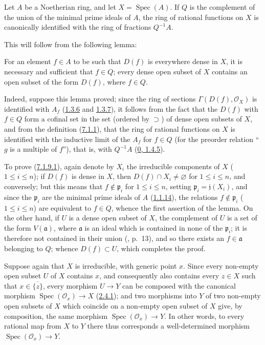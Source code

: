 \begin{corollary}[7.1.9]
\label{I.7.1.9}
Let $A$ be a Noetherian ring, and let $X=\operatorname{Spec}(A)$. If $Q$ is
the complement of the union of the minimal prime ideals of $A$, the ring of
rational functions on $X$ is canonically identified with the ring of
fractions $Q^{-1}A$.
\end{corollary}

This will follow from the following lemma:

\begin{lemma}[7.1.9.1]
\label{I.7.1.9.1}
For an element $f\in A$ to be such that $D(f)$ is everywhere dense in $X$, it
is necessary and sufficient that $f\in Q$; every dense open subset of $X$
contains an open subset of the form $D(f)$, where $f\in Q$.
\end{lemma}

Indeed, suppose this lemma proved; since the ring of sections
$\Gamma(D(f),\mathscr{O}_X)$ is identified with $A_f$
(\hyperref[I.1.3.6]{1.3.6} and \hyperref[I.1.3.7]{1.3.7}), it follows
from the fact that the $D(f)$ with $f\in Q$ form a cofinal set in the set
(ordered by $\supset$) of dense open subsets of $X$, and from the definition
(\hyperref[I.7.1.1]{7.1.1}), that the ring of rational functions on $X$ is
identified with the inductive limit of the $A_f$ for $f\in Q$ (for the
preorder relation ``$g$ is a multiple of $f$''), that is, with $Q^{-1}A$
(\hyperref[0.1.4.5]{0, 1.4.5}).

To prove (\hyperref[I.7.1.9.1]{7.1.9.1}), again denote by $X_i$ the
irreducible components of $X$ ($1\leq i\leq n$); if $D(f)$ is dense in $X$,
then $D(f)\cap X_i\neq\varnothing$ for $1\leq i\leq n$, and conversely; but
this means that $f\notin\mathfrak{p}_i$ for $1\leq i\leq n$, setting
$\mathfrak{p}_i=\mathfrak{j}(X_i)$, and since the $\mathfrak{p}_i$ are the
minimal prime ideals of $A$ (\hyperref[I.1.1.14]{1.1.14}), the relations
$f\notin\mathfrak{p}_i$ ($1\leq i\leq n$) are equivalent to $f\in Q$, whence
the first assertion of the lemma. On the other hand, if $U$ is a dense open
subset of $X$, the complement of $U$ is a set of the form $V(\mathfrak{a})$,
where $\mathfrak{a}$ is an ideal which is contained in none of the
$\mathfrak{p}_i$; it is therefore not contained in their union (\cite{I-10},
p.~13), and so there exists an $f\in\mathfrak{a}$ belonging to $Q$; whence
$D(f)\subset U$, which completes the proof.

\begin{env}[7.1.10]
\label{I.7.1.10}
Suppose again that $X$ is irreducible, with generic point $x$. Since every
non-empty open subset $U$ of $X$ contains $x$, and consequently also contains
every $z\in X$ such that $x\in\overline{\{z\}}$, every morphism $U\to Y$ can
be composed with the canonical morphism $\operatorname{Spec}(\mathscr{O}_x)\to X$
(\hyperref[I.2.4.1]{2.4.1}); and two morphisms into $Y$ of two non-empty
open subsets of $X$ which coincide on a non-empty open subset of $X$ give, by
composition, the same morphism $\operatorname{Spec}(\mathscr{O}_x)\to Y$. In
other words, to every rational map from $X$ to $Y$ there thus corresponds a
well-determined morphism $\operatorname{Spec}(\mathscr{O}_x)\to Y$.
\end{env}

